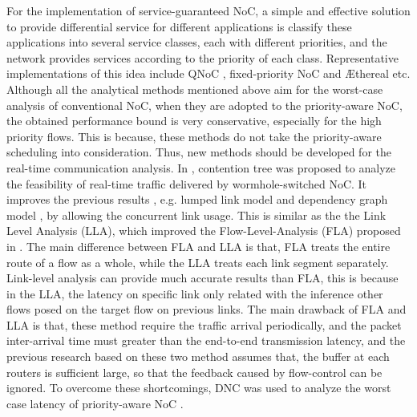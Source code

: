 \documentclass[10pt,journal]{IEEEtran}
\begin{document}
For the implementation of service-guaranteed NoC, a simple and effective solution to provide differential service for different applications is classify these applications into several service classes, each with different priorities, and the network provides services according to the priority of each class. Representative implementations of this idea include QNoC \cite{BCGK04}, fixed-priority NoC \cite{5685465} and {{\AE}thereal} \cite{GoDR05}\cite{RiGW01} etc. Although all the analytical methods mentioned above aim for the worst-case analysis of conventional NoC, when they are adopted to the priority-aware NoC, the obtained performance bound is very conservative, especially for the high priority flows. This is because, these methods do not take the priority-aware scheduling into consideration. Thus, new methods should be developed for the real-time communication analysis. In \cite{LuJS05}, contention tree was proposed to analyze the feasibility of real-time traffic delivered by wormhole-switched NoC. It improves the previous results , e.g. lumped link model \cite{707545} and dependency graph model \cite{708526}, by allowing the concurrent link usage. This is similar as the the Link Level Analysis \cite{73}\cite{holisticNoC13} (LLA), which improved the Flow-Level-Analysis (FLA) proposed in \cite{Shi:2008:RCA:1397757.1397996}. The main difference between FLA and LLA is that, FLA treats the entire route of a flow as a whole, while the LLA treats each link segment separately. Link-level analysis can provide much accurate results than FLA, this is because in the LLA, the latency on specific link only related with the inference other flows posed on the target flow on previous links. The main drawback of FLA and LLA is that, these method require the traffic arrival periodically, and the packet inter-arrival time must greater than the end-to-end transmission latency, and the previous research based on these two method assumes that, the buffer at each routers is sufficient large, so that the feedback caused by flow-control can be ignored. To overcome these shortcomings, DNC was used to analyze the worst case latency of priority-aware NoC \cite{Qian489900}.
\end{document}
